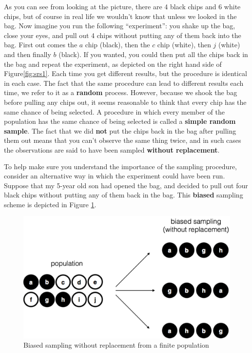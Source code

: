 \documentclass[]{book}
\begin{document}
As you can see from looking at the picture, there are 4 black chips and 6 white chips, but of course in real life we wouldn't know that unless we looked in the bag. Now imagine you run the following ``experiment'': you shake up the bag, close your eyes, and pull out 4 chips without putting any of them back into the bag. First out comes the \(a\) chip (black), then the \(c\) chip (white), then \(j\) (white) and then finally \(b\) (black). If you wanted, you could then put all the chips back in the bag and repeat the experiment, as depicted on the right hand side of Figure\ref{fig:srs1}. Each time you get different results, but the procedure is identical in each case. The fact that the same procedure can lead to different results each time, we refer to it as a \textbf{random} process. However, because we shook the bag before pulling any chips out, it seems reasonable to think that every chip has the same chance of being selected. A procedure in which every member of the population has the same chance of being selected is called a \textbf{simple random sample}. The fact that we did \textbf{not} put the chips back in the bag after pulling them out means that you can't observe the same thing twice, and in such cases the observations are said to have been sampled \textbf{without replacement}.

To help make sure you understand the importance of the sampling procedure, consider an alternative way in which the experiment could have been run. Suppose that my 5-year old son had opened the bag, and decided to pull out four black chips without putting any of them back in the bag. This \textbf{biased} sampling scheme is depicted in Figure \ref{fig:brs}.

\begin{figure}
\centering
\includegraphics{navarro_img/estimation/brs.pdf}
\caption{\label{fig:brs}Biased sampling without replacement from a finite population}
\end{figure}
\end{document}
